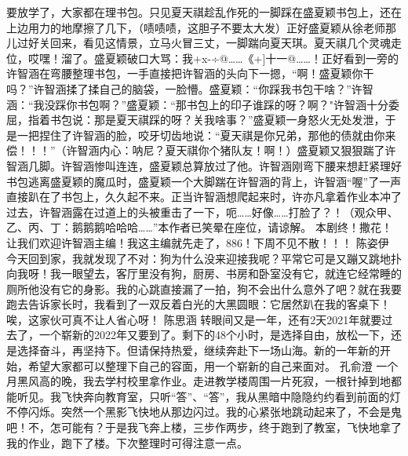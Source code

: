 {}要放学了，大家都在理书包。只见夏天祺趁乱作死的一脚踩在盛夏颖书包上，还在上边用力的地摩擦了几下，（啧啧啧，这胆子不要太大发）正好盛夏颖从徐老师那儿过好关回来，看见这情景，立马火冒三丈，一脚踹向夏天琪。夏天祺几个灵魂走位，哎嘿！溜了。盛夏颖破口大骂：我+x-÷@……《+]十一@……！正好看到一旁的许智涵在弯腰整理书包，一手直接把许智涵的头向下一摁，“啊！盛夏颖你干吗？”许智涵揉了揉自己的脑袋，一脸懵。盛夏颖：“你踩我书包干啥？”许智涵：“我没踩你书包啊？”盛夏颖：“那书包上的印子谁踩的呀？啊？"许智涵十分委屈，指着书包说：\markdownRendererTilde{}那是夏天祺踩的呀？关我啥事？”盛夏颖一身怒火无处发泄，于是一把捏住了许智涵的脸，咬牙切齿地说：“夏天祺是你兄弟，那他的债就由你来偿！！！”（许智涵内心：呐尼？夏天祺你个猪队友！啊！）盛夏颖又狠狠踹了许智涵几脚。许智涵惨叫连连，盛夏颖总算放过了他。许智涵刚弯下腰来想赶紧理好书包逃离盛夏颖的魔瓜时，盛夏颖一个大脚踹在许智涵的背上，许智涵“喔”了一声直接趴在了书包上，久久起不来。正当许智涵想爬起来时，许亦凡拿着作业本冲了过去，许智涵露在过道上的头被重击了一下，呃……好像……打脸了？！（观众甲、乙、丙、丁：鹅鹅鹅哈哈哈……”本作者已笑晕在座位，请谅解。\markdownRendererInterblockSeparator
{}本剧终！撒花！\markdownRendererInterblockSeparator
{}让我们欢迎许智涵主编！我这主编就先走了，886！下周不见不散！！！\markdownRendererInterblockSeparator
{}\markdownRendererInterblockSeparator
{}陈姿伊\markdownRendererInterblockSeparator
{}今天回到家，我就发现了不对：狗为什么没来迎接我呢？平常它可是又蹦又跳地扑向我呀！我一眼望去，客厅里没有狗，厨房、书房和卧室没有它，就连它经常睡的厕所他没有它的身影。我的心跳直接漏了一拍，狗不会出什么意外了吧？就在我要跑去告诉家长时，我看到了一双反着白光的大黑圆眼：它居然趴在我的客桌下！唉，这家伙可真不让人省心呀！\markdownRendererInterblockSeparator
{}\markdownRendererInterblockSeparator
{}陈思涵\markdownRendererInterblockSeparator
{}转眼间又是一年，还有2天2021年就要过去了，一个崭新的2022年又要到了。剩下的48个小时，是选择自由，放松一下，还是选择奋斗，再坚持下。但请保持热爱，继续奔赴下一场山海。新的一年新的开始，希望大家都可以整理下自己的容面，用一个崭新的自己来面对。\markdownRendererInterblockSeparator
{}\markdownRendererInterblockSeparator
{}孔俞澄\markdownRendererInterblockSeparator
{}一个月黑风高的晚，我去学村校里拿作业。走进教学楼周围一片死寂，一根针掉到地都能听见。我飞快奔向教育室，只听“答”、“答”，我从黑暗中隐隐约约看到前面的灯不停闪烁。突然一个黑影飞快地从那边闪过。我的心紧张地跳动起来了，不会是鬼吧！不，怎可能有？于是我飞奔上楼，三步作两步，终于跑到了教室，飞快地拿了我的作业，跑下了楼。下次整理时可得注意一点。\markdownRendererInterblockSeparator
